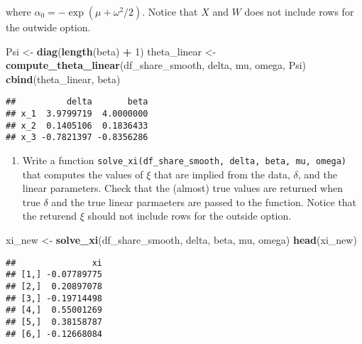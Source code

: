 \documentclass[
]{book}
\newenvironment{Shaded}{\begin{snugshade}}{\end{snugshade}}
\newcommand{\DecValTok}[1]{\textcolor[rgb]{0.00,0.00,0.81}{#1}}
\newcommand{\KeywordTok}[1]{\textcolor[rgb]{0.13,0.29,0.53}{\textbf{#1}}}
\newcommand{\NormalTok}[1]{#1}
\newcommand{\OperatorTok}[1]{\textcolor[rgb]{0.81,0.36,0.00}{\textbf{#1}}}
\newcommand{\StringTok}[1]{\textcolor[rgb]{0.31,0.60,0.02}{#1}}
\providecommand{\tightlist}{%
  \setlength{\itemsep}{0pt}\setlength{\parskip}{0pt}}
\begin{document}
where \(\alpha_0 = - \exp(\mu + \omega^2/2)\). Notice that \(X\) and \(W\) does not include rows for the outwide option.

\begin{Shaded}
\begin{Highlighting}[]
\NormalTok{Psi <-}\StringTok{ }\KeywordTok{diag}\NormalTok{(}\KeywordTok{length}\NormalTok{(beta) }\OperatorTok{+}\StringTok{ }\DecValTok{1}\NormalTok{)}
\NormalTok{theta_linear <-}
\StringTok{  }\KeywordTok{compute_theta_linear}\NormalTok{(df_share_smooth, delta, mu, omega, Psi) }
\KeywordTok{cbind}\NormalTok{(theta_linear, beta)}
\end{Highlighting}
\end{Shaded}

\begin{verbatim}
##          delta       beta
## x_1  3.9799719  4.0000000
## x_2  0.1405106  0.1836433
## x_3 -0.7821397 -0.8356286
\end{verbatim}

\begin{enumerate}
\def\labelenumi{\arabic{enumi}.}
\setcounter{enumi}{10}
\tightlist
\item
  Write a function \texttt{solve\_xi(df\_share\_smooth,\ delta,\ beta,\ mu,\ omega)} that computes the values of \(\xi\) that are implied from the data, \(\delta\), and the linear parameters. Check that the (almost) true values are returned when true \(\delta\) and the true linear parmaeters are passed to the function. Notice that the returend \(\xi\) should not include rows for the outside option.
\end{enumerate}

\begin{Shaded}
\begin{Highlighting}[]
\NormalTok{xi_new <-}\StringTok{ }\KeywordTok{solve_xi}\NormalTok{(df_share_smooth, delta, beta, mu, omega)}
\KeywordTok{head}\NormalTok{(xi_new)}
\end{Highlighting}
\end{Shaded}

\begin{verbatim}
##               xi
## [1,] -0.07789775
## [2,]  0.20897078
## [3,] -0.19714498
## [4,]  0.55001269
## [5,]  0.38158787
## [6,] -0.12668084
\end{verbatim}

\begin{Shaded}
\end{Shaded}
\end{document}

